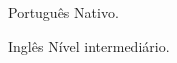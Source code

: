 

\begin{cvskills}

  \cvskill
    {Português} %
    {Nativo.} %

  \cvskill
    {Inglês} %
    {Nível intermediário.} %
    


\end{cvskills}





